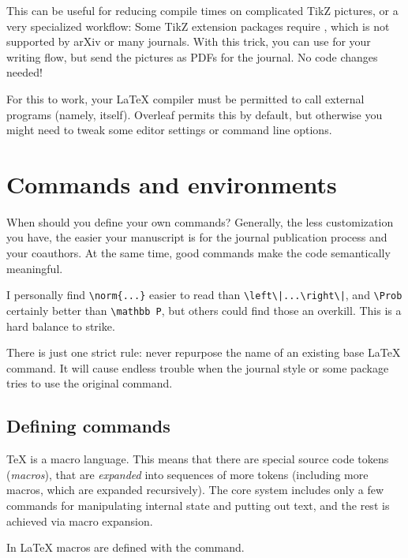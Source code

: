 This can be useful for reducing compile times on complicated TikZ pictures,
or a very specialized workflow:
Some TikZ extension packages require ,
which is not supported by arXiv or many journals.
With this trick, you can use  for your writing flow,
but send the pictures as PDFs for the journal.
No code changes needed!


\begin{technote}
For this to work, your \LaTeX{} compiler must be permitted to call external programs
(namely, itself).
Overleaf permits this by default, but otherwise you might need to tweak some editor settings
or command line options.
\end{technote}




%
%
%
\section{Commands and environments}

\begin{practices}
When should you define your own commands?
Generally, the less customization you have,
the easier your manuscript is for the journal publication process and your coauthors.
At the same time, good commands make the code semantically meaningful.

I personally find \verb&\norm{...}& easier to read than \verb&\left\|...\right\|&,
and \verb|\Prob| certainly better than \verb|\mathbb P|,
but others could find those an overkill.
This is a hard balance to strike.

There is just one strict rule:
never repurpose the name of an existing base \LaTeX{} command.
It will cause endless trouble when the journal style or some package tries to use the original command.
\end{practices}


\subsection{Defining commands}
\TeX{} is a macro language.
This means that there are special source code tokens (\emph{macros}),
that are \emph{expanded} into sequences of more tokens
(including more macros, which are expanded recursively).
The core system includes only a few commands for manipulating internal state and putting out text,
and the rest is achieved via macro expansion.

In \LaTeX{} macros are defined with the  command.

